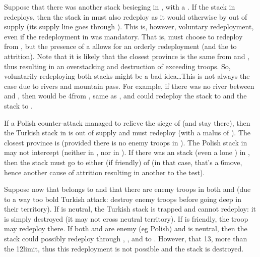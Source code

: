 \begin{exemple}
  Suppose that there was another stack besieging \villeBuda in
  \provinceMagyarorszag, with a \USURE\Faceplus. If the stack in
  \provinceBanat redeploys, then the stack in \provinceMagyarorszag must also
  redeploy as it would otherwise by out of supply (its supply line goes
  through \provinceBanat). This is, however, voluntary redeployment, even if
  the redeployment in \provinceBanat was mandatory. That is, \TUR must choose
  to redeploy from \provinceMagyarorszag, but the presence of a
  \USURE\Faceplus allows for an orderly redeployment (and the  to
  attrition). Note that it is likely that the closest province is the same
  from \provinceBanat and \provinceMagyarorszag, thus resulting in an
  overstacking and destruction of exceeding troops. So, voluntarily
  redeploying both stacks might be a bad idea\ldots This is not always the
  case due to rivers and mountain pass. For example, if there was no river
  between \provinceMagyarorszag and \provinceCroatie, then \provinceSerbia
  would be 4\MP from \provinceMagyarorszag, same as \provinceValahia, and \TUR
  could redeploy the \provinceBanat stack to \provinceValahia and the
  \provinceMagyarorszag stack to \provinceSerbia.
\end{exemple}  

\begin{exemple}
  If a Polish counter-attack managed to relieve the siege of \provinceBanat
  (and stay there), then the Turkish stack in \provinceMagyarorszag is out of
  supply and must redeploy (with a malus of ). The closest province
  is \provinceSerbia (provided there is no enemy troops in
  \provinceCroatie). The Polish stack in \provinceBanat may not intercept
  (neither in \provinceCroatie, nor in \provinceSerbia). If there was an
  \paysHongrie stack (even a lone \LD) in \provinceCroatie, then the stack
  must go to either \provinceMoldova (if friendly) of \provinceValahia (in
  that case, that's a 6\MP move, hence another cause of attrition resulting in
  another  to the test).
\end{exemple}  

\begin{exemple}
  Suppose now that \provinceDalmacija belongs to \VEN and that there are enemy
  troops in both \provinceCroatie and \provinceErdely (due to a way too bold
  Turkish attack: destroy enemy troops before going deep in their
  territory). If \paysMoldavie is neutral, the Turkish stack is trapped and
  cannot redeploy: it is simply destroyed (it may not cross neutral
  territory). If \provinceMoldova is friendly, the troop may redeploy
  there. If both \provinceMoldova and \provinceBasarabia are enemy (eg Polish)
  and \provinceValahia is neutral, then the stack could possibly redeploy
  through \provinceKarpatok, \provinceBukovina, \provinceMoldova and
  \provinceBasarabia to \provinceRumeli. However, that 13\MP, more than the
  12\MP limit, thus this redeployment is not possible and the stack is
  destroyed.
\end{exemple}  

